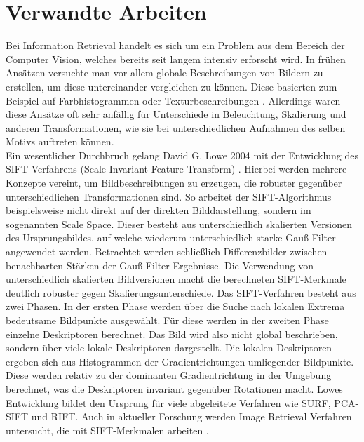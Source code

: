 \chapter{Verwandte Arbeiten}\label{related_work}
Bei Information Retrieval handelt es sich um ein Problem aus dem Bereich der Computer Vision, welches bereits seit langem intensiv erforscht wird. In frühen Ansätzen versuchte man vor allem globale Beschreibungen von Bildern zu erstellen, um diese untereinander vergleichen zu können. Diese basierten zum Beispiel auf Farbhistogrammen oder Texturbeschreibungen \cite{early_days}. Allerdings waren diese Ansätze oft sehr anfällig für Unterschiede in Beleuchtung, Skalierung und anderen Transformationen, wie sie bei unterschiedlichen Aufnahmen des selben Motivs auftreten können.
\\
Ein wesentlicher Durchbruch gelang David G. Lowe 2004 mit der Entwicklung des SIFT-Verfahrens (Scale Invariant Feature Transform) \cite{sift}. Hierbei werden mehrere Konzepte vereint, um Bildbeschreibungen zu erzeugen, die robuster gegenüber unterschiedlichen Transformationen sind. So arbeitet der SIFT-Algorithmus beispielsweise nicht direkt auf der direkten Bilddarstellung, sondern im sogenannten Scale Space. Dieser besteht aus unterschiedlich skalierten Versionen des Ursprungsbildes, auf welche wiederum unterschiedlich starke Gauß-Filter angewendet werden. Betrachtet werden schließlich Differenzbilder zwischen benachbarten Stärken der Gauß-Filter-Ergebnisse. Die Verwendung von unterschiedlich skalierten Bildversionen macht die berechneten SIFT-Merkmale deutlich robuster gegen Skalierungsunterschiede. Das SIFT-Verfahren besteht aus zwei Phasen. In der ersten Phase werden über die Suche nach lokalen Extrema bedeutsame Bildpunkte ausgewählt. Für diese werden in der zweiten Phase einzelne Deskriptoren berechnet. Das Bild wird also nicht global beschrieben, sondern über viele lokale Deskriptoren dargestellt. Die lokalen Deskriptoren ergeben sich aus Histogrammen der Gradientrichtungen umliegender Bildpunkte. Diese werden relativ zu der dominanten Gradientrichtung in der Umgebung berechnet, was die Deskriptoren invariant gegenüber Rotationen macht. Lowes Entwicklung bildet den Ursprung für viele abgeleitete Verfahren wie SURF\cite{surf}, PCA-SIFT\cite{pca_sift} und RIFT\cite{rift}. Auch in aktueller Forschung werden Image Retrieval Verfahren untersucht, die mit SIFT-Merkmalen arbeiten \cite{modern_sift_useage}. \\
